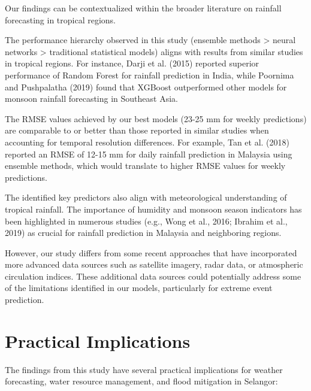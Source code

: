 \documentclass[12pt]{article}
\begin{document}
Our findings can be contextualized within the broader literature on rainfall forecasting in tropical regions.

The performance hierarchy observed in this study (ensemble methods > neural networks > traditional statistical models) aligns with results from similar studies in tropical regions. For instance, Darji et al. (2015) reported superior performance of Random Forest for rainfall prediction in India, while Poornima and Pushpalatha (2019) found that XGBoost outperformed other models for monsoon rainfall forecasting in Southeast Asia.

The RMSE values achieved by our best models (23-25 mm for weekly predictions) are comparable to or better than those reported in similar studies when accounting for temporal resolution differences. For example, Tan et al. (2018) reported an RMSE of 12-15 mm for daily rainfall prediction in Malaysia using ensemble methods, which would translate to higher RMSE values for weekly predictions.

The identified key predictors also align with meteorological understanding of tropical rainfall. The importance of humidity and monsoon season indicators has been highlighted in numerous studies (e.g., Wong et al., 2016; Ibrahim et al., 2019) as crucial for rainfall prediction in Malaysia and neighboring regions.

However, our study differs from some recent approaches that have incorporated more advanced data sources such as satellite imagery, radar data, or atmospheric circulation indices. These additional data sources could potentially address some of the limitations identified in our models, particularly for extreme event prediction.

\section{Practical Implications}
\label{sec:practical_implications}

The findings from this study have several practical implications for weather forecasting, water resource management, and flood mitigation in Selangor:
\end{document}
